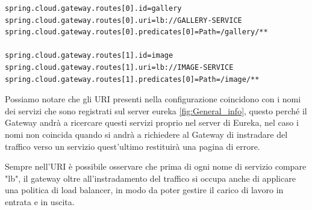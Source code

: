 \begin{lstlisting}[caption=Application.properties del Gateway]
spring.cloud.gateway.routes[0].id=gallery
spring.cloud.gateway.routes[0].uri=lb://GALLERY-SERVICE
spring.cloud.gateway.routes[0].predicates[0]=Path=/gallery/**

spring.cloud.gateway.routes[1].id=image
spring.cloud.gateway.routes[1].uri=lb://IMAGE-SERVICE
spring.cloud.gateway.routes[1].predicates[0]=Path=/image/**
\end{lstlisting}

Possiamo notare che gli URI presenti nella configurazione coincidono con i nomi dei servizi che sono registrati sul server eureka \ref{fig:General_info}, questo perché il Gateway andrà a ricercare questi servizi proprio nel server di Eureka, nel caso i nomi non coincida quando si andrà a richiedere al Gateway di instradare del traffico verso un servizio quest'ultimo restituirà una pagina di errore.

Sempre nell'URI è possibile osservare che prima di ogni nome di servizio compare "lb", il gateway oltre all'instradamento del traffico si occupa anche di applicare una politica di load balancer, in modo da poter gestire il carico di lavoro in entrata e in uscita.


